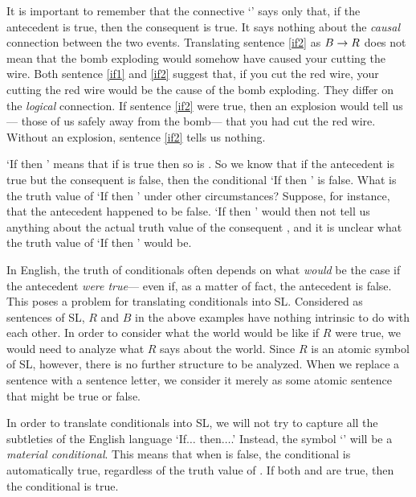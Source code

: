 It is important to remember that the connective `\eif' says only that, if the antecedent is true, then the consequent is true. It says nothing about the \emph{causal} connection between the two events. Translating sentence \ref{if2} as $B \rightarrow R$ does not mean that the bomb exploding would somehow have caused your cutting the wire. Both sentence \ref{if1} and \ref{if2} suggest that, if you cut the red wire, your cutting the red wire would be the cause of the bomb exploding. They differ on the \emph{logical} connection. If sentence \ref{if2} were true, then an explosion would tell us--- those of us safely away from the bomb--- that you had cut the red wire. Without an explosion, sentence \ref{if2} tells us nothing.



`If  then ' means that if  is true then so is . So we know that if the antecedent  is true but the consequent  is false, then the conditional `If  then ' is false. What is the truth value of `If  then ' under other circumstances? Suppose, for instance, that the antecedent  happened to be false. `If  then ' would then not tell us anything about the actual truth value of the consequent , and it is unclear what the truth value of `If  then ' would be.

In English, the truth of conditionals often depends on what \emph{would} be the case if the antecedent \emph{were true}--- even if, as a matter of fact, the antecedent is false. This poses a problem for translating conditionals into SL.  Considered as sentences of SL, $R$ and $B$ in the above examples have nothing intrinsic to do with each other. In order to consider what the world would be like if $R$ were true, we would need to analyze what $R$ says about the world. Since $R$ is an atomic symbol of SL, however, there is no further structure to be analyzed. When we replace a sentence with a sentence letter, we consider it merely as some atomic sentence that might be true or false.

In order to translate conditionals into SL, we will not try to capture all the subtleties of the English language `If$\ldots$ then$\ldots$.' Instead, the symbol `\eif' will be a \emph{material conditional}. This means that when  is false, the conditional \eif{} is automatically true, regardless of the truth value of . If both  and  are true, then the conditional \eif{} is true.


